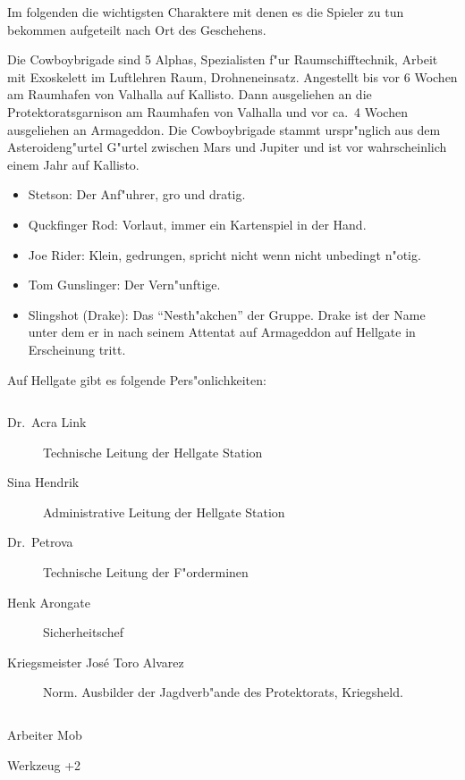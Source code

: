 
Im folgenden die wichtigsten Charaktere mit denen es die Spieler zu tun bekommen aufgeteilt nach Ort des Geschehens.


Die Cowboybrigade sind 5 Alphas, Spezialisten f"ur Raumschifftechnik, Arbeit mit Exoskelett im Luftlehren Raum, Drohneneinsatz.
Angestellt bis vor 6 Wochen am Raumhafen von Valhalla auf Kallisto. Dann ausgeliehen an die Protektoratsgarnison am Raumhafen von Valhalla und vor ca.~4 Wochen ausgeliehen an Armageddon. Die Cowboybrigade stammt urspr"nglich aus dem Asteroideng"urtel G"urtel zwischen Mars und Jupiter und ist vor wahrscheinlich einem Jahr auf Kallisto.

\begin{itemize}
    \item Stetson: Der Anf"uhrer, gro\3 und dratig.
    \item Quckfinger Rod: Vorlaut, immer ein Kartenspiel in der Hand.
    \item Joe Rider: Klein, gedrungen, spricht nicht wenn nicht unbedingt n"otig.
    \item Tom Gunslinger: Der Vern"unftige.
    \item Slingshot (Drake): Das "`Nesth"akchen"' der Gruppe. Drake ist der Name unter dem er in nach seinem Attentat 
    auf Armageddon auf Hellgate in Erscheinung tritt.
\end{itemize}

\newpage


Auf Hellgate gibt es folgende Pers"onlichkeiten: 

\begin{column}[l]{0.45}
    \begin{description}
        \item[Dr.~Acra Link] Technische Leitung der Hellgate Station
        \item[Sina Hendrik] Administrative Leitung der Hellgate Station
        \item[Dr.~Petrova] Technische Leitung der F"orderminen
        \item[Henk Arongate] Sicherheitschef    
        \item[Kriegsmeister Jos\'{e} \frqq{}Toro\flqq{} Alvarez] Norm. Ausbilder der Jagdverb"ande des Protektorats, Kriegsheld.
    \end{description}
\end{column}
\begin{column}[r]{0.45}
    \begin{nscsheet}[h]{Arbeiter Mob}
        \nscstats[ATT=2,AGG=1,EMP=1,KNO=1,HP=10]
        \nscruler
        \begin{nscinventory}
            \nscitem[Waffen] Werkzeug +2            
        \end{nscinventory}
    \end{nscsheet}
\end{column}


